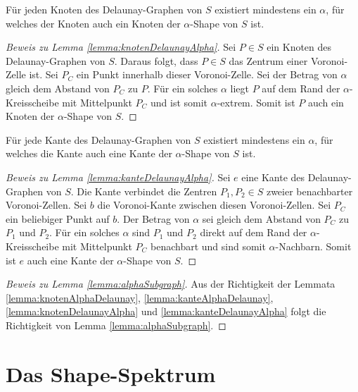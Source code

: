 \begin{lemma}\label{lemma:knotenDelaunayAlpha}
Für jeden Knoten des Delaunay-Graphen von $S$ existiert mindestens ein $\alpha$, für welches der Knoten auch ein Knoten der $\alpha$-Shape von $S$ ist.
\end{lemma}

\begin{proof}[Beweis zu Lemma \ref{lemma:knotenDelaunayAlpha}]
Sei $P \in S$ ein Knoten des Delaunay-Graphen von $S$. Daraus folgt, dass $P \in S$ das Zentrum einer Voronoi-Zelle ist. Sei $P_C$ ein Punkt innerhalb dieser Voronoi-Zelle. Sei der Betrag von $\alpha$ gleich dem Abstand von $P_C$ zu $P$. Für ein solches $\alpha$ liegt $P$ auf dem Rand der $\alpha$-Kreisscheibe mit Mittelpunkt $P_C$ und ist somit $\alpha$-extrem. Somit ist $P$ auch ein Knoten der $\alpha$-Shape von $S$.
\end{proof}

\begin{lemma}\label{lemma:kanteDelaunayAlpha}
Für jede Kante des Delaunay-Graphen von $S$ existiert mindestens ein $\alpha$, für welches die Kante auch eine Kante der $\alpha$-Shape von $S$ ist.
\end{lemma}

\begin{proof}[Beweis zu Lemma \ref{lemma:kanteDelaunayAlpha}]
Sei $e$ eine Kante des Delaunay-Graphen von $S$. Die Kante verbindet die Zentren $P_1,P_2 \in S$ zweier benachbarter Voronoi-Zellen. Sei $b$ die Voronoi-Kante zwischen diesen Voronoi-Zellen. Sei $P_C$ ein beliebiger Punkt auf $b$. Der Betrag von $\alpha$ sei gleich dem Abstand von $P_C$ zu $P_1$ und $P_2$. Für ein solches $\alpha$ sind $P_1$ und $P_2$ direkt auf dem Rand der $\alpha$-Kreisscheibe mit Mittelpunkt $P_C$ benachbart und sind somit $\alpha$-Nachbarn. Somit ist $e$ auch eine Kante der $\alpha$-Shape von $S$.
\end{proof}

\begin{proof}[Beweis zu Lemma \ref{lemma:alphaSubgraph}]
Aus der Richtigkeit der Lemmata \ref{lemma:knotenAlphaDelaunay}, \ref{lemma:kanteAlphaDelaunay}, \ref{lemma:knotenDelaunayAlpha} und \ref{lemma:kanteDelaunayAlpha} folgt die Richtigkeit von Lemma \ref{lemma:alphaSubgraph}.
\end{proof}

\section{Das Shape-Spektrum}

